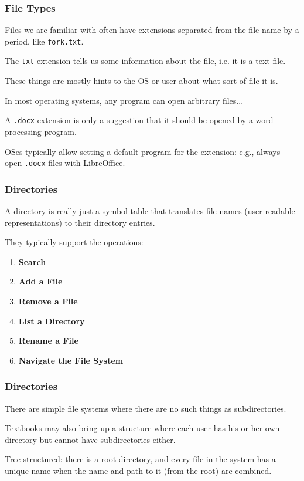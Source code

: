 \begin{frame}
	\frametitle{File Types}

	Files we are familiar with often have extensions separated from the file name by a period, like \texttt{fork.txt}.

	The \texttt{txt} extension tells us some information about the file, i.e. it is a text file.

	These things are mostly hints to the OS or user about what sort of file it is.

	In most operating systems, any program can open arbitrary files...

	A \texttt{.docx} extension is only a suggestion that it should be opened by a word processing program.

	OSes typically allow setting a default program for the extension: e.g., always open \texttt{.docx} files with LibreOffice.


\end{frame}

\begin{frame}
	\frametitle{Directories}

	A directory is really just a symbol table that translates file names (user-readable representations) to their directory entries.

	They typically support the operations:

	\begin{enumerate}
		\item \textbf{Search}
		\item \textbf{Add a File}
		\item \textbf{Remove a File}
		\item \textbf{List a Directory}
		\item \textbf{Rename a File}
		\item \textbf{Navigate the File System}
	\end{enumerate}


\end{frame}

\begin{frame}
	\frametitle{Directories}

	There are simple file systems where there are no such things as subdirectories.

	Textbooks may also bring up a structure where each user has his or her own directory but cannot have subdirectories either.

	Tree-structured: there is a root directory, and every file in the system has a unique name when the name and path to it (from the root) are combined.

\end{frame}

